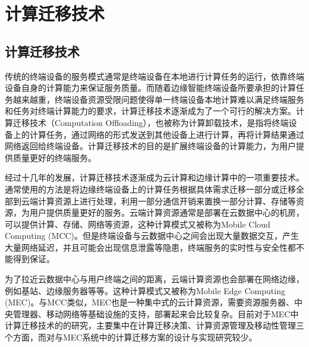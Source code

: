 

\section{计算迁移技术}\label{sec:related_work_computing_offloading}
\subsection{计算迁移技术}

传统的终端设备的服务模式通常是终端设备在本地进行计算任务的运行，依靠终端设备自身的计算能力来保证服务质量。而随着边缘智能终端设备所要承担的计算任务越来越重，终端设备资源受限问题使得单一终端设备本地计算难以满足终端服务和任务对终端计算能力的要求，计算迁移技术逐渐成为了一个可行的解决方案\cite{张文丽2016智能移动终端计算迁移研究}。计算迁移技术（Computation Offloading），也被称为计算卸载技术，是指将终端设备上的计算任务，通过网络的形式发送到其他设备上进行计算，再将计算结果通过网络返回给终端设备。计算迁移技术的目的是扩展终端设备的计算能力，为用户提供质量更好的终端服务。

经过十几年的发展，计算迁移技术逐渐成为云计算和边缘计算中的一项重要技术\cite{崔勇2017移动云计算研究进展与趋势}。通常使用的方法是将边缘终端设备上的计算任务根据具体需求迁移一部分或迁移全部到云端计算资源上进行处理，利用一部分通信开销来置换一部分计算、存储等资源，为用户提供质量更好的服务\cite{徐乃凡2018面向边缘云高效能的移动终端计算迁移方法}。云端计算资源通常是部署在云数据中心的机房，可以提供计算、存储、网络等资源，这种计算模式又被称为Mobile Cloud Computing (MCC)\cite{barbarossa2014communicating}。但是终端设备与云数据中心之间会出现大量数据交互，产生大量网络延迟，并且可能会出现信息泄露等隐患，终端服务的实时性与安全性都不能得到保证\cite{shi2016edge}。

为了拉近云数据中心与用户终端之间的距离，云端计算资源也会部署在网络边缘，例如基站、边缘服务器等等。这种计算模式又被称为Mobile Edge Computing (MEC)\cite{董浩2019移动边缘计算环境下服务工作流的计算卸载,mach2017mobile}。与MCC类似，MEC也是一种集中式的云计算资源，需要资源服务器、中央管理器、移动网络等基础设施的支持，部署起来会比较复杂。目前对于MEC中计算迁移技术的的研究，主要集中在计算迁移决策、计算资源管理及移动性管理三个方面，而对与MEC系统中的计算迁移方案的设计与实现研究较少\cite{谢人超2018移动边缘计算卸载技术综述}。


